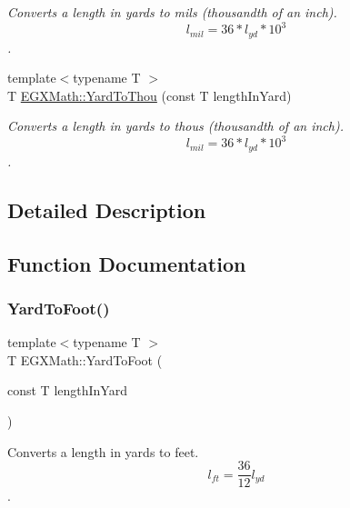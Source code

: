 \begin{DoxyCompactItemize}
\begin{DoxyCompactList}\small\item\em Converts a length in yards to mils (thousandth of an inch). \[ l_{mil}=36 * l_{yd} * 10^{3} \]. \end{DoxyCompactList}\item 
{\footnotesize template$<$typename T $>$ }\\T \mbox{\hyperlink{group___e_g_x_math-_conversions-_length_conversions-_imperial-_yard-_imperial_ga396e348746bc01bce2844579b2b3d90f}{E\+G\+X\+Math\+::\+Yard\+To\+Thou}} (const T length\+In\+Yard)
\begin{DoxyCompactList}\small\item\em Converts a length in yards to thous (thousandth of an inch). \[ l_{mil}=36 * l_{yd} * 10^{3} \]. \end{DoxyCompactList}\end{DoxyCompactItemize}


\subsection{Detailed Description}


\subsection{Function Documentation}
\mbox{\label{group___e_g_x_math-_conversions-_length_conversions-_imperial-_yard-_imperial_gaa61dd96db004bb07d9fca00a214fe265}} 
\subsubsection{\texorpdfstring{Yard\+To\+Foot()}{YardToFoot()}}
{\footnotesize\ttfamily template$<$typename T $>$ \\
T E\+G\+X\+Math\+::\+Yard\+To\+Foot (\begin{DoxyParamCaption}\item[{const T}]{length\+In\+Yard }\end{DoxyParamCaption})}



Converts a length in yards to feet. \[ l_{ft}= \frac{36}{12} l_{yd} \]. 

